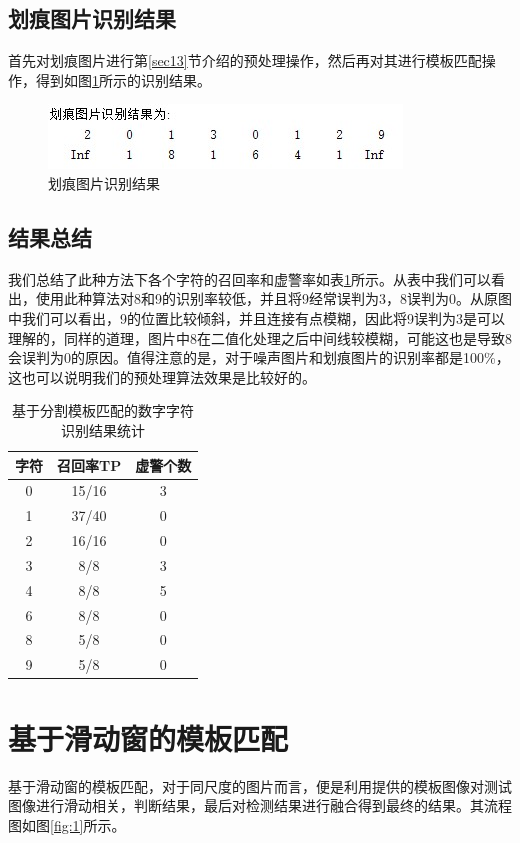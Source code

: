 \documentclass[cn]{elegantbook}
\begin{document}
\subsection{划痕图片识别结果}
首先对划痕图片进行第\ref{sec13}节介绍的预处理操作，然后再对其进行模板匹配操作，得到如图\ref{res6}所示的识别结果。

\begin{figure}[!h]
	\centering
	\includegraphics[width=\textwidth]{res6}
	\caption{\label{res6}划痕图片识别结果}
\end{figure}

\subsection{结果总结}
我们总结了此种方法下各个字符的召回率和虚警率如表\ref{tab1}所示。从表中我们可以看出，使用此种算法对8和9的识别率较低，并且将9经常误判为3，8误判为0。从原图中我们可以看出，9的位置比较倾斜，并且连接有点模糊，因此将9误判为3是可以理解的，同样的道理，图片中8在二值化处理之后中间线较模糊，可能这也是导致8会误判为0的原因。值得注意的是，对于噪声图片和划痕图片的识别率都是100\%，这也可以说明我们的预处理算法效果是比较好的。

\begin{table}[!htbp]
	\centering
	\caption{基于分割模板匹配的数字字符识别结果统计}\label{tab1}%
	\begin{tabular}{ccc}
		\toprule
		字符& 召回率TP& 虚警个数\\
		\midrule
		0& 15/16 & 3\\
		1& 37/40 & 0\\
		2& 16/16 & 0\\
		3& 8/8 & 3 \\
		4& 8/8 & 5 \\
		6& 8/8 & 0 \\
		8& 5/8 & 0 \\
		9& 5/8 & 0 \\
		\bottomrule
	\end{tabular}
\end{table}

\section{基于滑动窗的模板匹配}
\label{sec2}
基于滑动窗的模板匹配，对于同尺度的图片而言，便是利用提供的模板图像对测试图像进行滑动相关，判断结果，最后对检测结果进行融合得到最终的结果。其流程图如图\ref{fig:1}所示。
\end{document}
